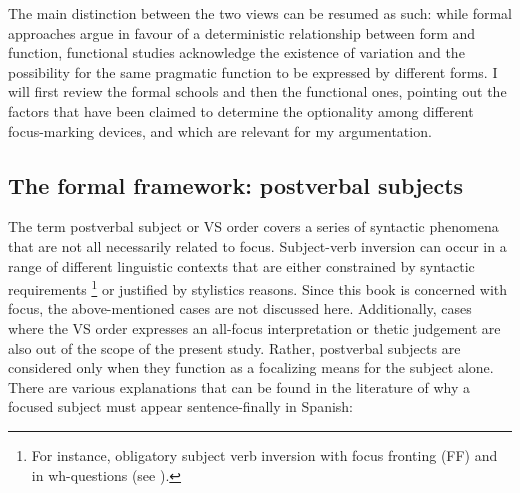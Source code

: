 The main distinction between the two views can be resumed as such: while formal approaches argue in favour of a deterministic relationship between form and function, functional studies acknowledge the existence of variation and the possibility for the same pragmatic function to be expressed by different forms. I will first review the formal schools and then the functional ones, pointing out the factors that have been claimed to determine the optionality among different focus-marking devices, and which are relevant for my argumentation.

\subsection{The formal framework: postverbal subjects}
 
The term postverbal subject or VS order covers a series of syntactic phenomena that are not all necessarily related to focus. Subject-verb inversion can occur in a range of different linguistic contexts that are either constrained by syntactic requirements \footnote{For instance, obligatory subject verb inversion with focus fronting (FF) and in wh-questions (see \cite{gutierrez2013structural}).} or justified by stylistics reasons. Since this book is concerned with focus, the above-mentioned cases are not discussed here. Additionally, cases where the VS order expresses an all-focus interpretation or thetic judgement \parencite{sasse1987thetic} are also out of the scope of the present study. Rather, postverbal subjects are considered only when they function as a focalizing means for the subject alone. There are various explanations that can be found in the literature of why a focused subject must appear sentence-finally in Spanish:


